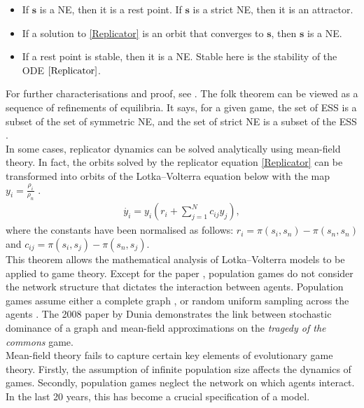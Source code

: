 \begin{itemize}
    \item If $\mathbf{s}$ is a NE, then it is a rest point. If $\mathbf{s}$ is a strict NE, then it is an attractor. 
    \item If a solution to \eqref{Replicator} is an orbit that converges to $\mathbf{s}$, then $\mathbf{s}$ is a NE. 
    \item If a rest point is stable, then it is a NE. Stable here is the stability of the ODE $\eqref{Replicator}$. 
\end{itemize}
For further characterisations and proof, see \cite{RN99, RN81}. The folk theorem can be viewed as a sequence of refinements of equilibria. It says,  for a given game, the set of ESS is a subset of the set of symmetric NE, and the set of strict NE is a subset of the ESS \cite{RN91}.  \\


In some cases, replicator dynamics can be solved analytically using mean-field theory. In fact, the orbits solved by the replicator equation \eqref{Replicator} can be transformed into orbits of the Lotka--Volterra equation below with the map $y_i = \frac{\rho_i}{\rho_n}$ \cite{RN81}.
\begin{align*} \label{LV}
    \dot{y_i} = y_i\left ( r_i + \sum_{j =1}^N c_{ij} y_j \right ),
\end{align*}
where the constants have been normalised as follows: $r_i = \pi(s_i,s_n) - \pi(s_n,s_n)$ and $c_{ij} = \pi(s_i,s_j) - \pi(s_n,s_j)$. \\


This theorem allows the mathematical analysis of Lotka--Volterra models to be applied to game theory. Except for the paper \cite{RN75}, population games do not consider the network structure that dictates the interaction between agents. Population games assume either a complete graph \cite{RN67}, or random uniform sampling across the agents \cite{RN47}. The 2008 paper by Dunia \cite{RN75} demonstrates the link between stochastic dominance of a graph and mean-field approximations on the \emph{tragedy of the commons} game. \\

Mean-field theory fails to capture certain key elements of evolutionary game theory. Firstly, the assumption of infinite population size affects the dynamics of games. Secondly, population games neglect the network on which agents interact. In the last 20 years, this has become a crucial specification of a model. \\

